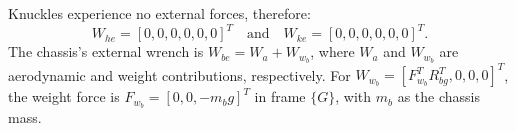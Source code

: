 Knuckles experience no external forces, therefore:
\begin{equation}\label{eqn:Whe}
	W_{he}=[0,0,0,0,0,0]^T\quad\textrm{and}\quad W_{ke}=[0,0,0,0,0,0]^T.
\end{equation}
The chassis's external wrench is $W_{be}=W_a+W_{w_b}$, %
where $W_a$ and $W_{w_b}$ are aerodynamic and weight contributions, respectively. For $W_{w_b}=[F_{w_b}^T R_{bg}^T, 0, 0, 0]^T$, the weight force is $F_{w_b}=[0, 0, -m_b g]^T$ in frame $\{G\}$, with $m_b$ as the chassis mass.
%
%
%

